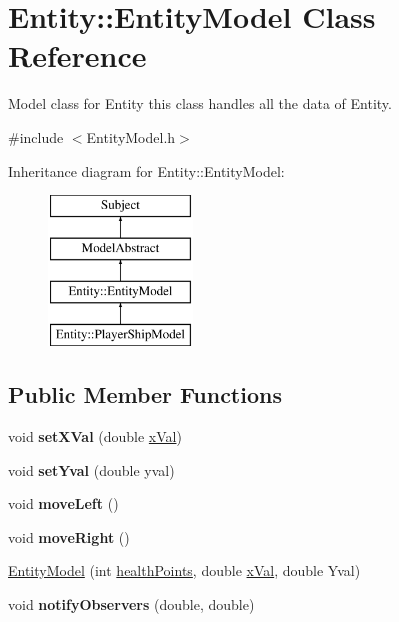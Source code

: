 \hypertarget{classEntity_1_1EntityModel}{}\section{Entity\+:\+:Entity\+Model Class Reference}
\label{classEntity_1_1EntityModel}


Model class for Entity this class handles all the data of Entity.  




{\ttfamily \#include $<$Entity\+Model.\+h$>$}

Inheritance diagram for Entity\+:\+:Entity\+Model\+:\begin{figure}[H]
\begin{center}
\leavevmode
\includegraphics[height=4.000000cm]{classEntity_1_1EntityModel}
\end{center}
\end{figure}
\subsection*{Public Member Functions}
\begin{DoxyCompactItemize}
\item 
\mbox{\label{classEntity_1_1EntityModel_a1ed361b3812b74fe14e66313f4f29c32}} 
void {\bfseries set\+X\+Val} (double \hyperlink{classEntity_1_1EntityModel_aac6eb5f2b4e0b953a104e6aac0de6f22}{x\+Val})
\item 
\mbox{\label{classEntity_1_1EntityModel_a99f1a7c318bdea0b52284ea3c6176427}} 
void {\bfseries set\+Yval} (double yval)
\item 
\mbox{\label{classEntity_1_1EntityModel_ae9f1924f345347765941ff38c220ee68}} 
void {\bfseries move\+Left} ()
\item 
\mbox{\label{classEntity_1_1EntityModel_a55decbf24325a034989c7235b2019d02}} 
void {\bfseries move\+Right} ()
\item 
\hyperlink{classEntity_1_1EntityModel_a13d4ef395649df7741fc6f73e0993f82}{Entity\+Model} (int \hyperlink{classEntity_1_1EntityModel_a975263695b038cb5d11218226526c734}{health\+Points}, double \hyperlink{classEntity_1_1EntityModel_aac6eb5f2b4e0b953a104e6aac0de6f22}{x\+Val}, double Yval)
\item 
\mbox{\label{classEntity_1_1EntityModel_aee6f83739c150d0c4d9b097aa3d7dca6}} 
void {\bfseries notify\+Observers} (double, double)
\end{DoxyCompactItemize}
